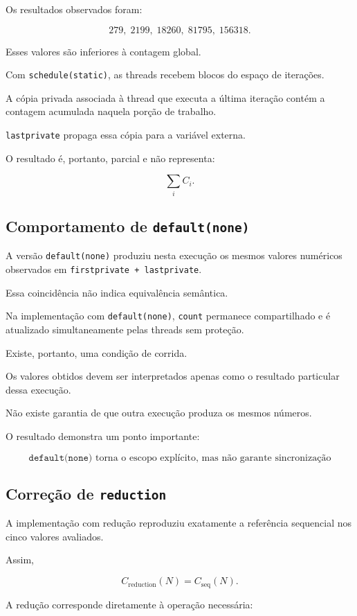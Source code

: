 Os resultados observados foram:

\[
279,\;
2199,\;
18260,\;
81795,\;
156318.
\]

Esses valores são inferiores à contagem global.

Com \texttt{schedule(static)}, as threads recebem blocos do espaço de
iterações.

A cópia privada associada à thread que executa a última iteração contém a
contagem acumulada naquela porção de trabalho.

\texttt{lastprivate} propaga essa cópia para a variável externa.

O resultado é, portanto, parcial e não representa:

\[
\sum_i C_i.
\]


\subsection{Comportamento de \texttt{default(none)}}

A versão \texttt{default(none)} produziu nesta execução os mesmos valores
numéricos observados em \texttt{firstprivate + lastprivate}.

Essa coincidência não indica equivalência semântica.

Na implementação com \texttt{default(none)}, \texttt{count} permanece
compartilhado e é atualizado simultaneamente pelas threads sem proteção.

Existe, portanto, uma condição de corrida.

Os valores obtidos devem ser interpretados apenas como o resultado
particular dessa execução.

Não existe garantia de que outra execução produza os mesmos números.

O resultado demonstra um ponto importante:

\[
\boxed{
\texttt{default(none)}
\text{ torna o escopo explícito, mas não garante sincronização}
}
\]


\subsection{Correção de \texttt{reduction}}

A implementação com redução reproduziu exatamente a referência sequencial
nos cinco valores avaliados.

Assim,

\[
C_{\mathrm{reduction}}(N)
=
C_{\mathrm{seq}}(N).
\]

A redução corresponde diretamente à operação necessária:

